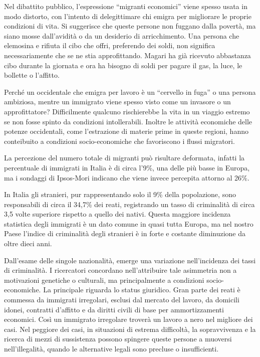 \documentclass[12pt]{book} %
\begin{document}
Nel dibattito pubblico, l’espressione “migranti economici” viene spesso usata in modo distorto, con l’intento di delegittimare chi emigra per migliorare le proprie condizioni di vita. Si suggerisce che queste persone non fuggano dalla povertà, ma siano mosse dall’avidità o da un desiderio di arricchimento.
Una persona che elemosina e rifiuta il cibo che offri, preferendo dei soldi, non significa necessariamente che se ne stia approfittando. Magari ha già ricevuto abbastanza cibo durante la giornata e ora ha bisogno di soldi per pagare il gas, la luce, le bollette o l’affitto.

Perché un occidentale che emigra per lavoro è un “cervello in fuga” o una persona ambiziosa, mentre un immigrato viene spesso visto come un invasore o un approfittatore? Difficilmente qualcuno rischierebbe la vita in un viaggio estremo se non fosse spinto da condizioni intollerabili.
Inoltre le attività economiche delle potenze occidentali, come l’estrazione di materie prime in queste regioni, hanno conteibuito a condizioni socio-economiche che favoriscono i flussi migratori.

La percezione del numero totale di migranti può risultare deformata, infatti la percentuale di immigrati in Italia è di circa l'9\%, una delle più basse in Europa, ma i sondaggi di Ipsos-Mori indicano che viene invece percepita attorno al 26\%.

In Italia gli stranieri, pur rappresentando solo il 9\% della popolazione, sono responsabili di circa il 34,7\% dei reati, registrando un tasso di criminalità di circa 3,5 volte superiore rispetto a quello dei nativi. Questa maggiore incidenza statistica degli immigrati è un dato comune in quasi tutta Europa, ma nel nostro Paese l'indice di criminalità degli stranieri è in forte e costante diminuzione da oltre dieci anni.

Dall'esame delle singole nazionalità, emerge una variazione nell'incidenza dei tassi di criminalità. I ricercatori concordano nell'attribuire tale asimmetria non a motivazioni genetiche o culturali, ma principalmente a condizioni socio-economiche. 
La principale riguarda lo status giuridico. Gran parte dei reati è commessa da immigrati irregolari, esclusi dal mercato del lavoro, da domicili idonei, contratti d'affitto e da diritti civili di base per ammortizzamenti economici.
Così un immigrato irregolare troverà un lavoro a nero nel migliore dei casi. Nel peggiore dei casi, in situazioni di estrema difficoltà, la sopravvivenza e la ricerca di mezzi di sussistenza possono spingere queste persone a muoversi nell'illegalità, quando le alternative legali sono precluse o insufficienti. 
\end{document}
